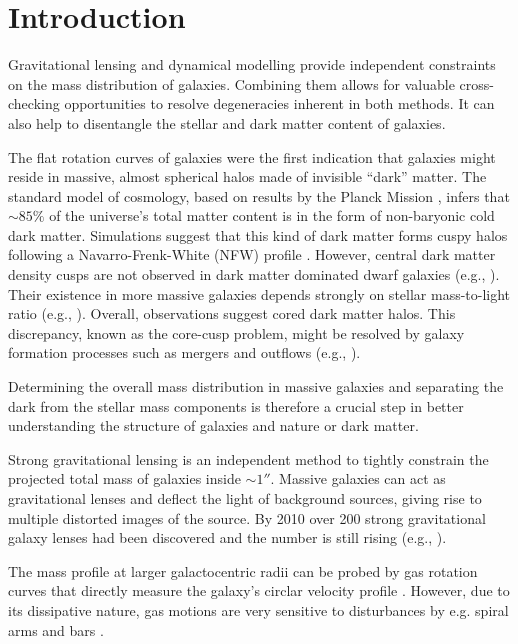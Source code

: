 \section{Introduction}

Gravitational lensing and dynamical modelling provide independent constraints on the mass distribution of galaxies. Combining them allows for valuable cross-checking opportunities to resolve degeneracies inherent in both methods. It can also help to disentangle the stellar and dark matter content of galaxies.

The flat rotation curves of galaxies \citep{1978ApJ...225L.107R} were the first indication that galaxies might reside in massive, almost spherical halos made of invisible ``dark'' matter. The standard model of cosmology, based on results by the Planck Mission \citep{WMAP5cosm} , infers that $\sim 85\%$ of the universe's total matter content is in the form of non-baryonic cold dark matter. Simulations suggest that this kind of dark matter forms cuspy halos following a Navarro-Frenk-White (NFW) profile \citep{NFW96}. However, central dark matter density cusps are not observed in dark matter dominated dwarf galaxies (e.g., \citealt{1994Natur.370..629M,2001ApJ...552L..23D}). Their existence in more massive galaxies depends strongly on stellar mass-to-light ratio (e.g., \citealt{2011MNRAS.416..322D}). Overall, observations suggest cored dark matter halos. This discrepancy, known as the core-cusp problem, might be resolved by galaxy formation processes such as mergers and outflows (e.g., \citealt{2001ApJ...560..636E,2012MNRAS.421.3464P}).

Determining the overall mass distribution in massive galaxies and separating the dark from the stellar mass components is therefore a crucial step in better understanding the structure of galaxies and nature or dark matter.

Strong gravitational lensing is an independent method to tightly constrain the projected total mass of galaxies inside $\sim 1''$. Massive galaxies can act as gravitational lenses and deflect the light of background sources, giving rise to multiple distorted images of the source. By 2010 over 200 strong gravitational galaxy lenses had been discovered and the number is still rising (e.g., \citealt{2010ARA&A..48...87T}).

The mass profile at larger galactocentric radii can be probed by gas rotation curves that directly measure the galaxy's circlar velocity profile \Wilma{[TO DO: REF]}. However, due to its dissipative nature, gas motions are very sensitive to disturbances by e.g. spiral arms and bars \Wilma{[TO DO: REF]}.

